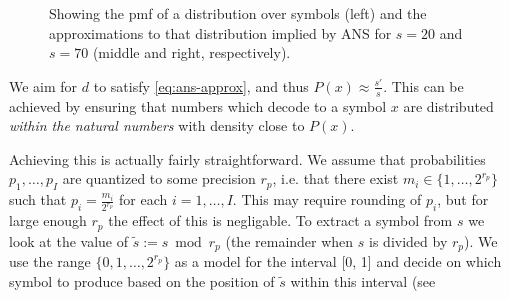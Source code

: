 \documentclass{article}
\begin{document}
\begin{figure}[t]
  \centering
  \drawpmf \quad {} \quad {}
  \caption{
    Showing the pmf of a distribution over symbols (left) and the
    approximations to that distribution implied by ANS for $s=20$ and $s=70$
    (middle and right, respectively).}\label{fig:visual-ans}
\end{figure}

We aim for $d$ to satisfy \cref{eq:ans-approx}, and thus $P(x)\approx
\frac{s'}{s}$. This can be achieved by ensuring that numbers which decode to a
symbol $x$ are distributed \emph{within the natural numbers} with density close
to $P(x)$.

Achieving this is actually fairly straightforward. We assume that probabilities
$p_1, \ldots, p_I$ are quantized to some precision $r_p$, i.e.  that there
exist $m_i\in\{1,\ldots,2^{r_p}\}$ such that $p_i = \frac{m_i}{2^{r_p}}$ for
each $i=1,\ldots,I$. This may require rounding of $p_i$, but for large enough
$r_p$ the effect of this is negligable. To extract a symbol from $s$ we look at
the value of $\tilde s := s \bmod r_p$ (the remainder when $s$ is divided by
$r_p$). We use the range $\{0, 1,\ldots,2^{r_p}\}$ as a model for the interval
[0, 1] and decide on which symbol to produce based on the position of $\tilde
s$ within this interval (see

\printbibliography
\end{document}
